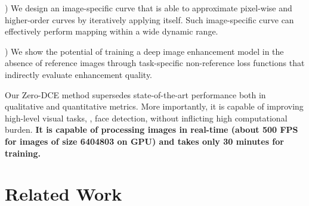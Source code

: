 \documentclass[10pt,twocolumn,letterpaper]{article}
\begin{document}
)
We design an image-specific curve that is able to approximate pixel-wise and higher-order curves by iteratively applying itself. Such image-specific curve can effectively perform mapping within a wide dynamic range.

)
We show the potential of training a deep image enhancement model in the absence of reference images through task-specific non-reference loss functions that indirectly evaluate enhancement quality.

Our Zero-DCE method supersedes state-of-the-art performance both in qualitative and quantitative metrics. More importantly, it is capable of improving high-level visual tasks, \eg, face detection, without inflicting high computational burden. \textbf{It is capable of processing images in real-time (about 500 FPS for images of size 6404803 on GPU) and takes only 30 minutes for training.}


\vspace{-5pt}
\section{Related Work}
\end{document}
